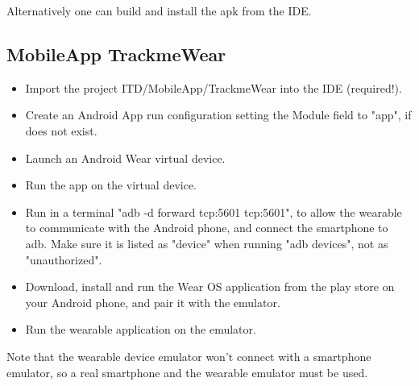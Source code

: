 \documentclass[../main.tex]{subfiles}
\begin{document}
Alternatively one can build and install the apk from the IDE.

\subsection{MobileApp TrackmeWear}

\begin{itemize}
	\item Import the project ITD/MobileApp/TrackmeWear into the IDE (required!).
	\item Create an Android App run configuration setting the Module field to "app", if does not exist.
	\item Launch an Android Wear virtual device.
	\item Run the app on the virtual device.
	\item Run in a terminal "adb -d forward tcp:5601 tcp:5601", to allow the wearable to communicate with the Android phone, and connect the smartphone to adb. Make sure it is listed as "device" when running "adb devices", not as "unauthorized".
	\item Download, install and run the Wear OS application from the play store on your Android phone, and pair it with the emulator.
	\item Run the wearable application on the emulator.
\end{itemize}

Note that the wearable device emulator won't connect with a smartphone emulator, so a real smartphone and the wearable emulator must be used.
\end{document}
